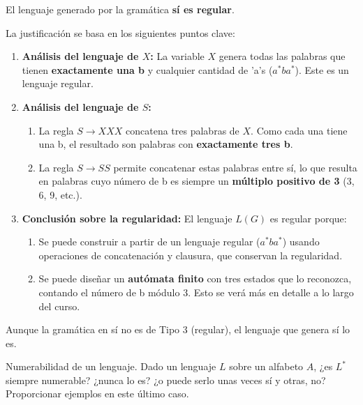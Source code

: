 \documentclass[12pt]{report} %
\begin{document}
\begin{solucion}

    El lenguaje generado por la gramática \textbf{sí es regular}.

    La justificación se basa en los siguientes puntos clave:

    \begin{enumerate}
        \item \textbf{Análisis del lenguaje de \( X \):} La variable \( X \) genera todas las palabras que tienen \textbf{exactamente una b} y cualquier cantidad de 'a's (\( a^*ba^* \)). Este es un lenguaje regular.

        \item \textbf{Análisis del lenguaje de \( S \):}
        \begin{enumerate}
            \item La regla \( S \to XXX \) concatena tres palabras de \( X \). Como cada una tiene una b, el resultado son palabras con \textbf{exactamente tres b}.
            \item La regla \( S \to SS \) permite concatenar estas palabras entre sí, lo que resulta en palabras cuyo número de b es siempre un \textbf{múltiplo positivo de 3} (3, 6, 9, etc.).
        \end{enumerate}

        \item \textbf{Conclusión sobre la regularidad:} El lenguaje \( L(G) \) es regular porque:
        \begin{enumerate}
            \item Se puede construir a partir de un lenguaje regular (\( a^*ba^* \)) usando operaciones de concatenación y clausura, que conservan la regularidad.
            \item Se puede diseñar un \textbf{autómata finito} con tres estados que lo reconozca, contando el número de b módulo 3. Esto se verá más en detalle a lo largo del curso.
        \end{enumerate}
    \end{enumerate}

    Aunque la gramática en sí no es de Tipo 3 (regular), el lenguaje que genera sí lo es.

\end{solucion}

\begin{ejercicio}
Numerabilidad de un lenguaje.
Dado un lenguaje $L$ sobre un alfabeto $A$, ¿es $L^*$ siempre numerable? ¿nunca lo es? ¿o puede serlo unas veces sí y otras, no? Proporcionar ejemplos en este último caso.
\end{ejercicio}
\end{document}
